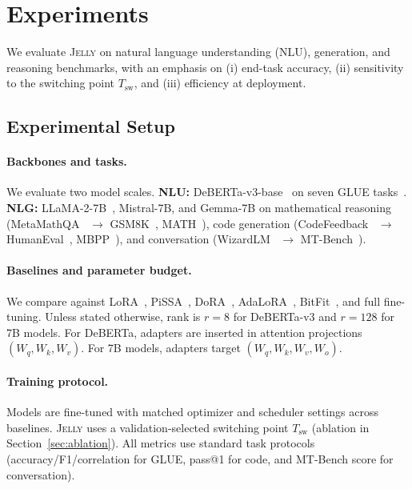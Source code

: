 \documentclass{article}
\newcommand{\Tswitch}{T_{\mathrm{sw}}}
\newcommand{\jelly}{\textsc{Jelly}}
\begin{document}
\section{Experiments}
\label{sec:experiments}

We evaluate \jelly{} on natural language understanding (NLU), generation, and reasoning benchmarks, with an emphasis on (i) end-task accuracy, (ii) sensitivity to the switching point $\Tswitch$, and (iii) efficiency at deployment.

\subsection{Experimental Setup}
\label{sec:setup}

\paragraph{Backbones and tasks.}
We evaluate two model scales.
\textbf{NLU:} DeBERTa-v3-base~\citep{he2023debertav3} on seven GLUE tasks~\citep{wang2019glue}.
\textbf{NLG:} LLaMA-2-7B~\citep{touvron2023llama2}, Mistral-7B, and Gemma-7B on mathematical reasoning (MetaMathQA~\citep{yu2024metamath} $\rightarrow$ GSM8K~\citep{cobbe2021gsm8k}, MATH~\citep{hendrycks2021math}), code generation (CodeFeedback~\citep{zhuo2024codefeedback} $\rightarrow$ HumanEval~\citep{chen2021humaneval}, MBPP~\citep{austin2021mbpp}), and conversation (WizardLM~\citep{xu2024wizardlm} $\rightarrow$ MT-Bench~\citep{zheng2023mtbench}).

\paragraph{Baselines and parameter budget.}
We compare against LoRA~\citep{hu2022lora}, PiSSA~\citep{meng2024pissa}, DoRA~\citep{liu2024dora}, AdaLoRA~\citep{zhang2023adalora}, BitFit~\citep{zaken2022bitfit}, and full fine-tuning.
Unless stated otherwise, rank is $r=8$ for DeBERTa-v3 and $r=128$ for 7B models.
For DeBERTa, adapters are inserted in attention projections $(W_q, W_k, W_v)$.
For 7B models, adapters target $(W_q, W_k, W_v, W_o)$.

\paragraph{Training protocol.}
Models are fine-tuned with matched optimizer and scheduler settings across baselines.
\jelly{} uses a validation-selected switching point $\Tswitch$ (ablation in Section~\ref{sec:ablation}).
All metrics use standard task protocols (accuracy/F1/correlation for GLUE, pass@1 for code, and MT-Bench score for conversation).
\end{document}
